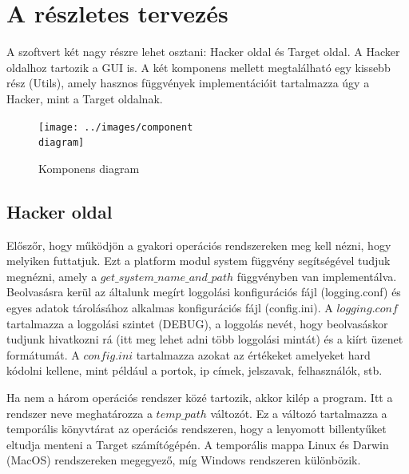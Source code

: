 \documentclass[12pt,a4paper,oneside]{report}
\begin{document}


\chapter{A részletes tervezés}\label{sec:plan}
A szoftvert két nagy részre lehet osztani: Hacker oldal és Target oldal. A Hacker oldalhoz tartozik a GUI is. A két komponens mellett megtalálható egy kissebb rész (Utils), amely hasznos függvények implementációit tartalmazza úgy a Hacker, mint a Target oldalnak.
\begin{figure}[H]
\centering
\texttt{[image: ../images/component\\ diagram]}
\caption{Komponens diagram}
\label{fig:compdia}
\end{figure}

\section{Hacker oldal}\label{subsec:server}
Előszőr, hogy működjön a gyakori operációs rendszereken meg kell nézni, hogy melyiken futtatjuk. Ezt a platform modul system függvény segítségével tudjuk megnézni, amely a $get\_system\_name\_and\_path$ függvényben van implementálva. Beolvasásra kerül az általunk megírt loggolási konfigurációs fájl (logging.conf) és egyes adatok tárolásához alkalmas konfigurációs fájl (config.ini). A $logging.conf$ tartalmazza a loggolási szintet (DEBUG), a loggolás nevét, hogy beolvasáskor tudjunk hivatkozni rá (itt meg lehet adni több loggolási mintát) és a kiírt üzenet formátumát. A $config.ini$ tartalmazza azokat az értékeket amelyeket hard kódolni kellene, mint például a portok, ip címek, jelszavak, felhasználók, stb.



Ha nem a három operációs rendszer közé tartozik, akkor kilép a program. Itt a rendszer neve meghatározza a $temp\_path$ változót. Ez a változó tartalmazza a temporális könyvtárat az operációs rendszeren, hogy a lenyomott billentyűket eltudja menteni a Target számítógépén. A temporális mappa Linux és Darwin (MacOS) rendszereken megegyező, míg Windows rendszeren különbözik.
\end{document}
